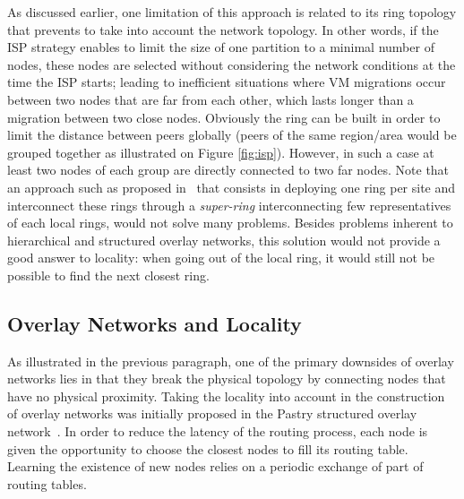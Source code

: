 As discussed earlier, one limitation of this approach is related to its ring topology that prevents to take into account the network topology. 
%
%
%
In other words, if the ISP strategy enables to limit the size of one partition to a minimal number of nodes, these nodes are selected without considering 
the network conditions at the time the ISP starts; leading to inefficient situations where VM migrations occur between two nodes that are far from each other, 
which lasts longer than a migration between two close nodes. Obviously the ring can
be built in order to limit the distance between peers globally (\ie peers of
the same region/area would be grouped together as illustrated on Figure \ref{fig:isp}). However, in such a case at least two nodes of each group are directly connected to 
two far nodes. 
%
Note that an approach such as proposed in~\cite{superchord} that consists
in deploying one ring per site and interconnect these rings through a
\emph{super-ring} interconnecting few representatives of each local rings, would
not solve many problems. Besides problems inherent to hierarchical and
structured overlay networks, this solution would not provide a good answer to
locality: when going out of the local ring, it would still not be possible to
find the next closest ring.
%


\subsection{Overlay Networks and Locality}

As illustrated in the previous paragraph, one of the primary downsides of
overlay networks lies in that they break the physical topology by connecting
nodes that have no physical proximity.
%
Taking the locality into account in the construction of overlay networks was
initially proposed in the Pastry structured overlay network~\cite{pastry}. In
order to reduce the latency of the routing process, each node is given the
opportunity to choose the closest nodes to fill its routing table. Learning the
existence of new nodes relies on a periodic exchange of part of routing tables.

